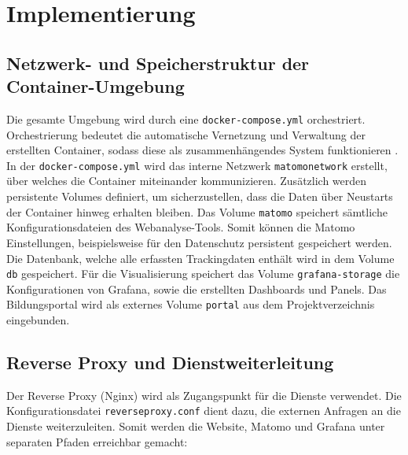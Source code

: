 \chapter{Implementierung}
\label{ch:implementierung}

\section{Netzwerk- und Speicherstruktur der Container-Umgebung}
Die gesamte Umgebung wird durch eine \texttt{docker-compose.yml} orchestriert. Orchestrierung bedeutet die automatische Vernetzung und Verwaltung der erstellten Container, sodass diese als zusammenhängendes System funktionieren \parencite{AWS}. In der \texttt{docker-compose.yml} wird das interne Netzwerk \texttt{matomo\textunderscore network} erstellt, über welches die Container miteinander kommunizieren. Zusätzlich werden persistente Volumes definiert, um sicherzustellen, dass die Daten über Neustarts der Container hinweg erhalten bleiben. Das Volume \texttt{matomo} speichert sämtliche Konfigurationsdateien des Webanalyse-Tools. Somit können die Matomo Einstellungen, beispielsweise für den Datenschutz persistent gespeichert werden. Die Datenbank, welche alle erfassten Trackingdaten enthält wird in dem Volume \texttt{db} gespeichert. Für die Visualisierung speichert das Volume \texttt{grafana-storage} die Konfigurationen von Grafana, sowie die erstellten Dashboards und Panels. Das Bildungsportal wird als externes Volume \texttt{portal} aus dem Projektverzeichnis eingebunden.

\section{Reverse Proxy und Dienstweiterleitung}
Der Reverse Proxy (Nginx) wird als Zugangspunkt für die Dienste verwendet. Die Konfigurationsdatei \texttt{reverse\textunderscore proxy.conf} dient dazu, die externen Anfragen an die Dienste weiterzuleiten. Somit werden die Website, Matomo und Grafana unter separaten Pfaden erreichbar gemacht: 


